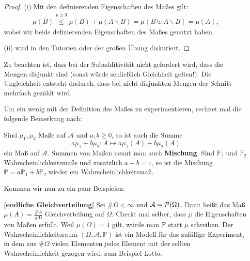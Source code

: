 \begin{proof}
(i) Mit den definierenden Eigenschaften des Ma\ss es gilt:	
\begin{align*}
	\mu(B) \overset{\mu\geq 0}{\leq} \mu(B) + \mu(A\backslash B) =\mu(B\cupdot A\backslash B)= \mu(A),
\end{align*}
wobei wir beide definierenden Eigenschaften des Ma\ss es genutzt haben.\smallskip

(ii) wird in den Tutorien oder der gro\ss en \"Ubung diskutiert. 
\end{proof}
Zu beachten ist, dass bei der Subadditivit\"at nicht gefordert wird, dass die Mengen disjunkt sind (sonst w\"urde schlie\ss lich Gleichheit gelten!). Die Ungleichheit entsteht dadurch, dass bei nicht-disjunkten Mengen der Schnitt mehrfach gez\"ahlt wird.\smallskip

Um ein wenig mit der Definition des Ma\ss es zu experimentieren, rechnet mal die folgende Bemerkung nach:
\begin{bem1}
	Sind $\mu_1,\mu_2$ Ma\ss e auf $\mathcal A$ und $a,b\geq 0$, so ist auch die Summe $$a\mu_1+b\mu_2: A\mapsto a\mu_1(A)+b\mu_2(A)$$ ein Ma\ss{} auf $\mathcal A$. Summen von Ma\ss en nennt man auch \textbf{Mischung}. Sind $\mathbb P_1$ und $\mathbb P_2$ Wahrscheinlichkeitsma\ss e und zus\"atzlich $a+b=1$, so ist die Mischung $\mathbb P= a \mathbb P_1+b\mathbb P_2$ wieder ein Wahrscheinlichkeitsma\ss. 
\end{bem1}



Kommen wir nun zu ein paar Beispielen:
\begin{beispiel}  \textbf{[endliche Gleichverteilung]}
	Sei $\#\Omega < \infty$ und $\mathcal{A} = \mathcal{P}(\Omega)$. Dann hei\ss t das Ma\ss{} $\mu(A) = \frac{\#A}{\#\Omega}$ Gleichverteilung auf $\Omega$. Checkt mal selber, dass $\mu$ die Eigenschaften von Ma\ss en erf\"ullt. Weil $\mu (\Omega) = 1$ gilt, würde man $\mathbb P$ statt $\mu$ schreiben. Der Wahrscheinlichkeitsraum $(\Omega, \mathcal A, \mathbb P)$ ist ein Modell f\"ur das zuf\"allige Experiment, in dem aus $\#\Omega$ vielen Elementen jedes Element mit der selben Wahrscheinlichkeit gezogen wird, zum Beispiel Lotto.
\end{beispiel}

